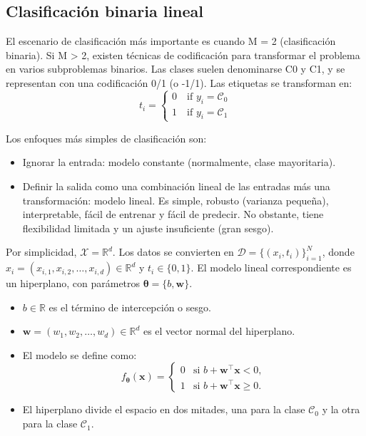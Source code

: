 \subsection{Clasificación binaria lineal}
El escenario de clasificación más importante es cuando M = 2 (clasificación binaria).
Si M > 2, existen técnicas de codificación para transformar el problema en varios subproblemas binarios.
Las clases suelen denominarse C0 y C1, y se representan con una codificación 0/1 (o -1/1). Las etiquetas se transforman en:
$$t_i = \begin{cases}
0 \quad \text{if } y_i = \mathcal{C}_0 \\
1 \quad  \text{if } y_i = \mathcal{C}_1
\end{cases}
$$

Los enfoques más simples de clasificación son:
\begin{itemize}
\item Ignorar la entrada: modelo constante (normalmente, clase mayoritaria).
\item Definir la salida como una combinación lineal de las entradas más una transformación: modelo lineal. Es simple, robusto (varianza pequeña), interpretable, fácil de entrenar y fácil de predecir. No obstante, tiene flexibilidad limitada y un ajuste insuficiente (gran sesgo).
\end{itemize}

Por simplicidad, $\mathcal{X}=\mathbb{R}^{d}$.
Los datos se convierten en $\mathcal{D}=\{(x_{i},t_{i})\}_{i=1}^{N}$, donde $x_{i}=(x_{i,1},x_{i,2},\ldots,x_{i,d})\in\mathbb{R}^{d}$ y $t_{i}\in\{0,1\}$.
El modelo lineal correspondiente es un hiperplano, con parámetros $\boldsymbol{\theta}=\{b,\mathbf{w}\}$.

\begin{itemize}
    \item $b\in\mathbb{R}$ es el término de intercepción o sesgo.
    
    \item $\mathbf{w}=(w_{1},w_{2},\ldots,w_{d})\in\mathbb{R}^{d}$ es el vector normal del hiperplano.
    
    \item El modelo se define como:
    \[f_{\boldsymbol{\theta}}(\mathbf{x})=\begin{cases}
    0 & \text{si } b+\mathbf{w}^{\intercal}\mathbf{x}<0, \\
    1 & \text{si } b+\mathbf{w}^{\intercal}\mathbf{x}\geq 0.
    \end{cases}\]
    
    \item El hiperplano divide el espacio en dos mitades, una para la clase $\mathcal{C}_{0}$ y la otra para la clase $\mathcal{C}_{1}$.
\end{itemize}

